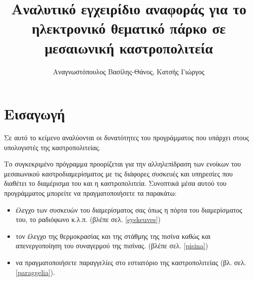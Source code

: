 \documentclass[a4paper,titlepage,twoside,12pt,leqno]{article}
\title{Αναλυτικό εγχειρίδιο αναφοράς για το ηλεκτρονικό θεματικό πάρκο σε μεσαιωνική καστροπολιτεία}
\author{Αναγνωστόπουλος Βασίλης-Θάνος, Κατσής Γιώργος}
\date{}
\begin{document}
\maketitle
\tableofcontents
\listoffigures
\listoftables
\newpage

\section{Εισαγωγή}



Σε αυτό το κείμενο αναλύονται οι δυνατότητες του προγράμματος που υπάρχει στους υπολογιστές της καστροπολιτείας.

Το συγκεκριμένο πρόγραμμα προορίζεται για την αλληλεπίδραση των ενοίκων του μεσαιωνικού καστροδιαμερίσματος με τις διάφορες συσκευές και υπηρεσίες που διαθέτει το διαμέρισμα του και η καστροπολιτεία. Συνοπτικά μέσα αυτού του προγράμματος μπορείτε να πραγματοποιήσετε τα παρακάτω:

\begin{itemize}
\item έλεγχο των συσκευών του διαμερίσματος σας όπως η πόρτα του διαμερίσματος του, το ραδιόφωνο κ.λ.π. (βλέπε σελ. \ref{syskeuves})
\item τον έλεγχο της θερμοκρασίας και της στάθμης της πισίνα καθώς και απενεργοποίηση του συναγερμού της πισίνας. (βλέπε σελ. \ref{pisina})
\item να πραγματοποιήσετε παραγγελίες στο εστιατόριο της καστροπολιτείας (βλ. σελ. \ref{paraggelia}).
\end{itemize}

\end{document}

